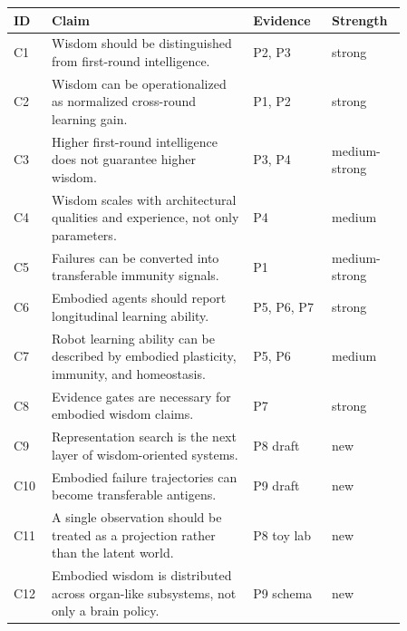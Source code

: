 \begin{tabular}{p{0.08\linewidth}p{0.46\linewidth}p{0.18\linewidth}p{0.14\linewidth}}
\toprule
ID & Claim & Evidence & Strength \\
\midrule
C1 & Wisdom should be distinguished from first-round intelligence. & P2, P3 & strong \\
C2 & Wisdom can be operationalized as normalized cross-round learning gain. & P1, P2 & strong \\
C3 & Higher first-round intelligence does not guarantee higher wisdom. & P3, P4 & medium-strong \\
C4 & Wisdom scales with architectural qualities and experience, not only parameters. & P4 & medium \\
C5 & Failures can be converted into transferable immunity signals. & P1 & medium-strong \\
C6 & Embodied agents should report longitudinal learning ability. & P5, P6, P7 & strong \\
C7 & Robot learning ability can be described by embodied plasticity, immunity, and homeostasis. & P5, P6 & medium \\
C8 & Evidence gates are necessary for embodied wisdom claims. & P7 & strong \\
C9 & Representation search is the next layer of wisdom-oriented systems. & P8 draft & new \\
C10 & Embodied failure trajectories can become transferable antigens. & P9 draft & new \\
C11 & A single observation should be treated as a projection rather than the latent world. & P8 toy lab & new \\
C12 & Embodied wisdom is distributed across organ-like subsystems, not only a brain policy. & P9 schema & new \\
\bottomrule
\end{tabular}
